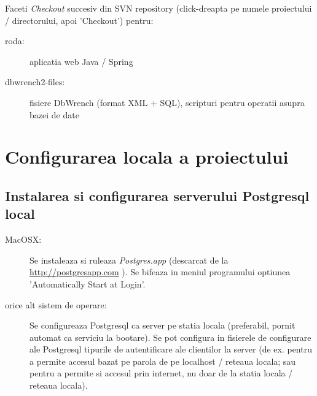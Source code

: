 Faceti \emph{Checkout} succesiv din SVN repository 
(click-dreapta pe numele proiectului / directorului, apoi 'Checkout') 
pentru:
\begin{description}
\item [roda:] aplicatia web Java / Spring
\item [dbwrench2-files:] fisiere DbWrench (format XML + SQL), scripturi pentru operatii asupra bazei de date
\end{description}

\begin{comment}
\item [(optional) RODA-Model:] modelul Perl
\end{comment}

\begin{comment}
In STS, se face upgrade la Subversion 1.7 (pt. working copy) pentru fiecare din proiectele de mai sus: 
in perspectiva 'Spring', 
in view-ul 'Package Explorer' sau in view-ul 'Navigator', 
click-dreapta pe numele proiectului respectiv,
si apoi in meniul aparut:
'Team' -> 'Upgrade' -> 'OK'. 
Poate aparea un mesaj de eroare/warning, care indica
faptul ca working-copy local este deja conform versiunii 1.7 a SVN.
\end{comment}

\section{Configurarea locala a proiectului}

\subsection{Instalarea si configurarea serverului Postgresql local}
\label{postgresql_configurare}

\begin{description}
\item[MacOSX:]

Se instaleaza si ruleaza \emph{Postgres.app} (descarcat de la \url{http://postgresapp.com} ).
Se bifeaza in meniul programului optiunea 'Automatically Start at Login'.

\item[orice alt sistem de operare:]

Se configureaza Postgresql ca server pe statia locala 
(preferabil, pornit automat ca serviciu la bootare). 
Se pot configura in fisierele de configurare ale Postgresql tipurile de autentificare ale clientilor la server 
(de ex. pentru a permite accesul bazat pe parola de pe localhost / reteaua locala; sau pentru a permite si accesul prin
internet, nu doar de la statia locala / reteaua locala).
\end{description}

